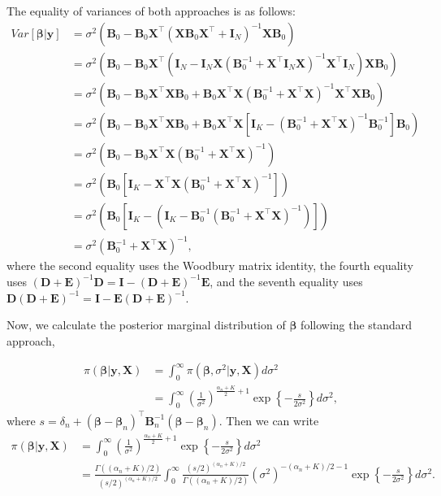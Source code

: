 The equality of variances of both approaches is as follows:
\begin{align*}
		Var[\bm{\beta}|\bm{y}]&
		= \sigma^2(\bm{B}_{0}-\bm{B}_{0}\bm{X}^{\top}(\bm{X}\bm{B}_{0}\bm{X}^\top+\bm{I}_N)^{-1} \bm{X}\bm{B}_{0})\\
		&=\sigma^2(\bm{B}_{0}-\bm{B}_{0}\bm{X}^{\top}(\bm{I}_N- \bm{I}_N\bm{X}(\bm{B}_{0}^{-1}+\bm{X}^{\top}\bm{I}_N\bm{X})^{-1}\bm{X}^{\top}\bm{I}_N)\bm{X}\bm{B}_{0})\\
		&=\sigma^2(\bm{B}_{0}-\bm{B}_{0}\bm{X}^{\top}\bm{X}\bm{B}_{0}+ \bm{B}_{0}\bm{X}^{\top}\bm{X}(\bm{B}_{0}^{-1}+\bm{X}^{\top}\bm{X})^{-1}\bm{X}^{\top}\bm{X}\bm{B}_{0})\\
		&=\sigma^2(\bm{B}_{0}-\bm{B}_{0}\bm{X}^{\top}\bm{X}\bm{B}_{0}+ \bm{B}_{0}\bm{X}^{\top}\bm{X}[\bm{I}_K-(\bm{B}_{0}^{-1}+\bm{X}^{\top}\bm{X})^{-1}\bm{B}_{0}^{-1}]\bm{B}_{0})\\
		&=\sigma^2(\bm{B}_{0}-\bm{B}_{0}\bm{X}^{\top}\bm{X}(\bm{B}_{0}^{-1}+\bm{X}^{\top}\bm{X})^{-1})\\
		&=\sigma^2(\bm{B}_{0}[\bm{I}_K-\bm{X}^{\top}\bm{X}(\bm{B}_{0}^{-1}+\bm{X}^{\top}\bm{X})^{-1}])\\
		&=\sigma^2(\bm{B}_{0}[\bm{I}_K-(\bm{I}_K-\bm{B}_{0}^{-1}(\bm{B}_{0}^{-1}+\bm{X}^{\top}\bm{X})^{-1})])\\
		&=\sigma^2(\bm{B}_{0}^{-1}+\bm{X}^{\top}\bm{X})^{-1},
\end{align*}
where the second equality uses the Woodbury matrix identity, the fourth equality uses $(\bm{D}+\bm{E})^{-1}\bm{D}=\bm{I}-(\bm{D}+\bm{E})^{-1}\bm{E}$, and the seventh equality uses $\bm{D}(\bm{D}+\bm{E})^{-1}=\bm{I}-\bm{E}(\bm{D}+\bm{E})^{-1}$.  

Now, we calculate the posterior marginal distribution of $\bm{\beta}$ following the standard approach,

\begin{align*}
	\pi(\bm{\beta}|{\bm{y}},{\bm{X}}) & = \int_0^{\infty} \pi(\bm{\beta}, \sigma^2|{\bm{y}},{\bm{X}}) d\sigma^2 \\
	& = \int_0^{\infty} \left(\frac{1}{\sigma^2}\right)^{\frac{\alpha_n+K}{2} + 1} \exp \left\{-\frac{s}{2\sigma^2}\right\} d\sigma^2,
\end{align*}
where $s = \delta_n + (\bm{\beta} - \bm{\beta}_n)^{\top}{{\bm{B}}}_n^{-1}(\bm{\beta} - \bm{\beta}_n)$. Then we can write
\begin{align*}
	\pi(\bm{\beta}|{\bm{y}},{\bm{X}}) & = \int_0^{\infty} \left(\frac{1}{\sigma^2}\right)^{\frac{\alpha_n+K}{2} + 1} \exp \left\{-\frac{s}{2\sigma^2}\right\} d\sigma^2 \\
	& = \frac{\Gamma((\alpha_n+K)/2)}{(s/2)^{(\alpha_n+K)/2}} \int_0^{\infty} \frac{(s/2)^{(\alpha_n+K)/2}}{\Gamma((\alpha_n+K)/2)} (\sigma^2)^{-(\alpha_n+K)/2 - 1} \exp \left\{-\frac{s}{2\sigma^2}\right\} d\sigma^2.
\end{align*}

